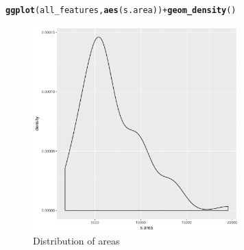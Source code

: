 \documentclass{article}\usepackage[]{graphicx}\usepackage[]{color}
\makeatletter
\newcommand{\hlopt}[1]{\textcolor[rgb]{0,0,0}{#1}}%
\newcommand{\hlstd}[1]{\textcolor[rgb]{0.345,0.345,0.345}{#1}}%
\newcommand{\hlkwd}[1]{\textcolor[rgb]{0.737,0.353,0.396}{\textbf{#1}}}%
\newenvironment{kframe}{%
 \def\at@end@of@kframe{}%
 \ifinner\ifhmode%
  \def\at@end@of@kframe{\end{minipage}}%
  \begin{minipage}{\columnwidth}%
 \fi\fi%
 \def\FrameCommand##1{\hskip\@totalleftmargin \hskip-\fboxsep
 \colorbox{shadecolor}{##1}\hskip-\fboxsep
     \hskip-\linewidth \hskip-\@totalleftmargin \hskip\columnwidth}%
 \MakeFramed {\advance\hsize-\width
   \@totalleftmargin\z@ \linewidth\hsize
   \@setminipage}}%
 {\par\unskip\endMakeFramed%
 \at@end@of@kframe}
\newenvironment{knitrout}{}{} %
\makeatother
\begin{document}
\begin{knitrout}
\color{fgcolor}\begin{kframe}
\begin{alltt}
\hlkwd{ggplot}\hlstd{(all_features,} \hlkwd{aes}\hlstd{(s.area))} \hlopt{+} \hlkwd{geom_density}\hlstd{()}
\end{alltt}
\end{kframe}\begin{figure}

{\centering \includegraphics[width=300px]{knit_figure/figarea-1} 

}

\caption[Distribution of areas]{Distribution of areas}\label{fig:area}
\end{figure}


\end{knitrout}
\end{document}
